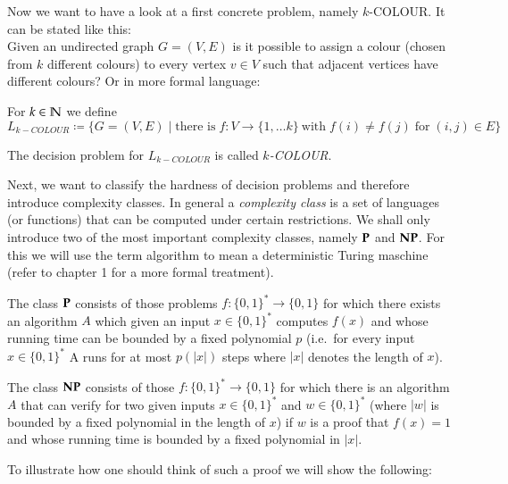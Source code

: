 Now we want to have a look at a first concrete problem, namely $k$-COLOUR. It can be stated like this: \\
 Given an undirected graph $ G = (V,E)$ is it possible to assign a colour (chosen from $k$ different colours) to every vertex 
 $v \in V$ such that adjacent vertices have different colours? Or in more formal language:

\begin{Problem}[$k$-COLOUR]
 For $k \in \mathbb{N}$ we define $$L_{k-COLOUR} \coloneqq \lbrace G  = (V,E) \; | 
 \; \text{there is} \; f \colon V \to \lbrace 1, \dotsc k \rbrace
 \ \text{with} \; f(i) \neq f(j) \; \text{for} \; (i,j) \in E \rbrace $$
 
 The decision problem for $L_{k-COLOUR}$ is called \emph{$k$-COLOUR}.
\end{Problem}

Next, we want to classify the hardness of decision problems and therefore introduce complexity classes. 
 In general a \emph{complexity class}
 is a set of languages (or functions) that can be computed under certain restrictions. We shall only introduce two 
 of the most important complexity classes, namely $\mathbf{P}$ and $\mathbf{NP}$. For this we will use the term algorithm
 to mean a deterministic Turing maschine (refer to \cite{Arora2009} chapter 1 for a more formal treatment). 
 
\begin{Definition}
 The class $\mathbf{P}$ consists of those problems $f \colon {\lbrace 0,1 \rbrace}^* \to {\lbrace 0,1 \rbrace}$ for
 which there exists an algorithm $A$ which given an input $x \in {\lbrace 0,1 \rbrace}^*$
 computes $f(x)$ and whose running time can be bounded by a fixed polynomial $p$ (i.e.\
 for every input $x \in {\lbrace 0,1 \rbrace}^*$ A runs for at most $p(|x|)$ steps where $|x|$ denotes the length of $x$).
\end{Definition}

\begin{Definition}
 The class $\mathbf{NP}$ consists of those $f \colon {\lbrace 0,1 \rbrace}^* \to {\lbrace 0,1 \rbrace}$ for which there is
 an algorithm $A$ that can verify for two given inputs $x \in {\lbrace 0,1 \rbrace}^*$ and 
 $w \in {\lbrace 0,1 \rbrace}^*$ (where $|w|$ is bounded by a fixed polynomial in the length of $x$) if $w$ is a proof
 that $f(x) = 1$ and whose running time is bounded by a fixed polynomial in  $|x|$.
\end{Definition}

To illustrate how one should think of such a proof  we will show the following:

